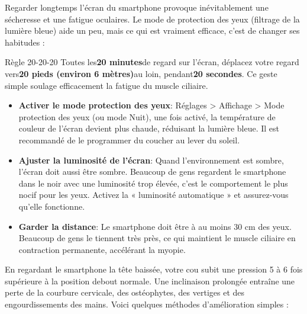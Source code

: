 
Regarder longtemps l'écran du smartphone provoque inévitablement une sécheresse et une fatigue oculaires. Le mode de protection des yeux (filtrage de la lumière bleue) aide un peu, mais ce qui est vraiment efficace, c'est de changer ses habitudes :

\begin{tcbinfo}{Règle 20-20-20}
Toutes les\textbf{20 minutes}de regard sur l'écran, déplacez votre regard vers\textbf{20 pieds (environ 6 mètres)}au loin, pendant\textbf{20 secondes}. Ce geste simple soulage efficacement la fatigue du muscle ciliaire.

\end{tcbinfo}

\begin{itemize}
  \item \textbf{Activer le mode protection des yeux}: Réglages > Affichage > Mode protection des yeux (ou mode Nuit), une fois activé, la température de couleur de l'écran devient plus chaude, réduisant la lumière bleue. Il est recommandé de le programmer du coucher au lever du soleil.
  \item \textbf{Ajuster la luminosité de l'écran}: Quand l'environnement est sombre, l'écran doit aussi être sombre. Beaucoup de gens regardent le smartphone dans le noir avec une luminosité trop élevée, c'est le comportement le plus nocif pour les yeux. Activez la « luminosité automatique » et assurez-vous qu'elle fonctionne.
  \item \textbf{Garder la distance}: Le smartphone doit être à au moins 30 cm des yeux. Beaucoup de gens le tiennent très près, ce qui maintient le muscle ciliaire en contraction permanente, accélérant la myopie.
\end{itemize}


En regardant le smartphone la tête baissée, votre cou subit une pression 5 à 6 fois supérieure à la position debout normale. Une inclinaison prolongée entraîne une perte de la courbure cervicale, des ostéophytes, des vertiges et des engourdissements des mains. Voici quelques méthodes d'amélioration simples :

